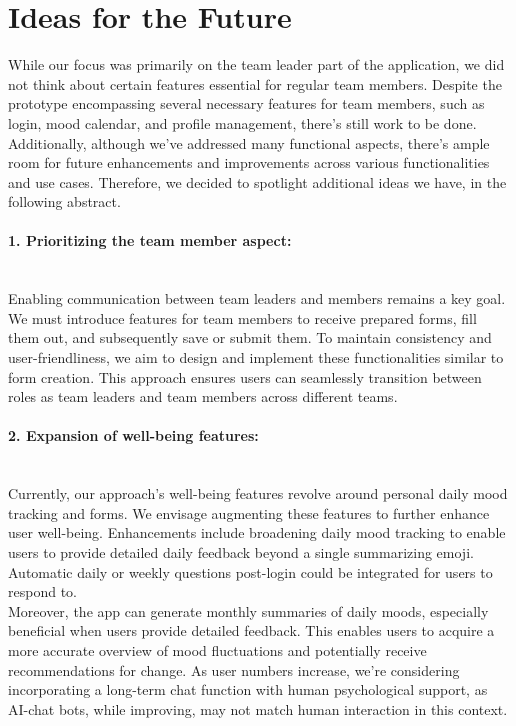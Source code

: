\documentclass[11pt]{article}
\begin{document}
\section{Ideas for the Future}
While our focus was primarily on the team leader part of the application, we did not think about certain features essential for regular team members. Despite the prototype encompassing several necessary features for team members, such as login, mood calendar, and profile management, there's still work to be done. Additionally, although we've addressed many functional aspects, there's ample room for future enhancements and improvements across various functionalities and use cases. Therefore, we decided to spotlight additional ideas we have, in the following abstract.

\paragraph{1. Prioritizing the team member aspect:}\mbox{} \\ 
Enabling communication between team leaders and members remains a key goal. We must introduce features for team members to receive prepared forms, fill them out, and subsequently save or submit them. To maintain consistency and user-friendliness, we aim to design and implement these functionalities similar to form creation. This approach ensures users can seamlessly transition between roles as team leaders and team members across different teams.

\paragraph{2. Expansion of well-being features:}\mbox{} \\ 
Currently, our approach's well-being features revolve around personal daily mood tracking and forms. We envisage augmenting these features to further enhance user well-being. Enhancements include broadening daily mood tracking to enable users to provide detailed daily feedback beyond a single summarizing emoji. Automatic daily or weekly questions post-login could be integrated for users to respond to.\\
Moreover, the app can generate monthly summaries of daily moods, especially beneficial when users provide detailed feedback. This enables users to acquire a more accurate overview of mood fluctuations and potentially receive recommendations for change. As user numbers increase, we're considering incorporating a long-term chat function with human psychological support, as AI-chat bots, while improving, may not match human interaction in this context.
\end{document}
